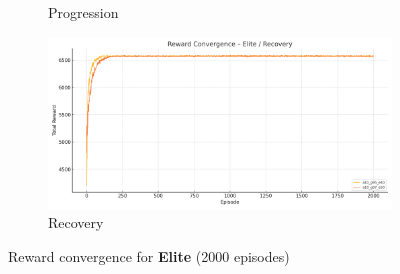 \begin{figure}[htbp]
\begin{subfigure}[b]{0.45\textwidth}
    \caption{Progression}
  \end{subfigure}
  \hfill
  \begin{subfigure}[b]{0.45\textwidth}
    \includegraphics[width=\textwidth]{images/elite_recovery_convergence.png}
    \caption{Recovery}
  \end{subfigure}
  \caption{Reward convergence for \textbf{Elite} (2000 episodes)}
  \label{fig:elite_convergence}
\end{figure}


